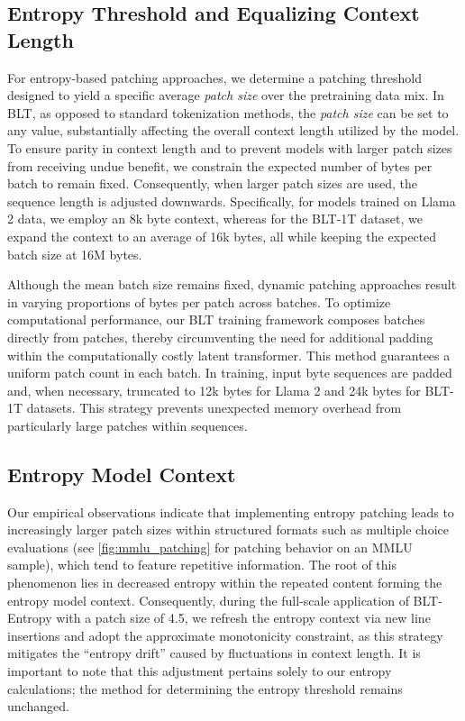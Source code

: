 \subsection{Entropy Threshold and Equalizing Context Length} For entropy-based patching approaches, we determine a patching threshold designed to yield a specific average \textit{patch size} over the pretraining data mix. In {\textsc BLT}, as opposed to standard tokenization methods, the \textit{patch size} can be set to any value, substantially affecting the overall context length utilized by the model. To ensure parity in context length and to prevent models with larger patch sizes from receiving undue benefit, we constrain the expected number of bytes per batch to remain fixed. Consequently, when larger patch sizes are used, the sequence length is adjusted downwards. Specifically, for models trained on Llama 2 data, we employ an 8k byte context, whereas for the {\textsc BLT}-1T dataset, we expand the context to an average of 16k bytes, all while keeping the expected batch size at 16M bytes.

Although the mean batch size remains fixed, dynamic patching approaches result in varying proportions of bytes per patch across batches. To optimize computational performance, our {\textsc BLT} training framework composes batches directly from patches, thereby circumventing the need for additional padding within the computationally costly latent transformer. This method guarantees a uniform patch count in each batch. In training, input byte sequences are padded and, when necessary, truncated to 12k bytes for Llama 2 and 24k bytes for {\textsc BLT}-1T datasets. This strategy prevents unexpected memory overhead from particularly large patches within sequences.

\subsection{Entropy Model Context}
\label{section:entropy-context}
Our empirical observations indicate that implementing entropy patching leads to increasingly larger patch sizes within structured formats such as multiple choice evaluations (see \autoref{fig:mmlu_patching} for patching behavior on an MMLU sample), which tend to feature repetitive information. The root of this phenomenon lies in decreased entropy within the repeated content forming the entropy model context. Consequently, during the full-scale application of {\textsc BLT}-Entropy with a patch size of 4.5, we refresh the entropy context via new line insertions and adopt the approximate monotonicity constraint, as this strategy mitigates the “entropy drift” caused by fluctuations in context length. It is important to note that this adjustment pertains solely to our entropy calculations; the method for determining the entropy threshold remains unchanged.

